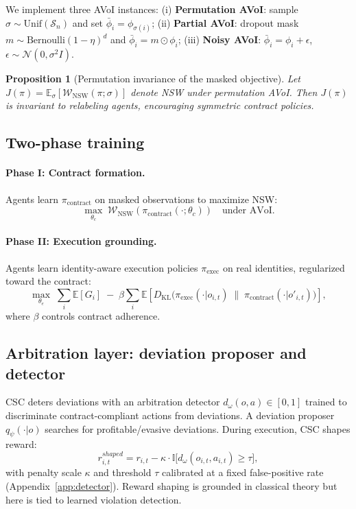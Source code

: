 \documentclass{article}
\theoremstyle{definition}
\theoremstyle{plain}
\newtheorem{proposition}{Proposition}
\theoremstyle{remark}
\newcommand{\NSW}{\mathcal{W}_{\mathrm{NSW}}}
\newcommand{\E}{\mathbb{E}}
\newcommand{\KL}{D_{\mathrm{KL}}}
\newcommand{\ind}{\mathbb{I}}
\begin{document}
We implement three AVoI instances:
(i) \textbf{Permutation AVoI}: sample $\sigma \sim \mathrm{Unif}(\mathcal{S}_n)$ and set $\bar{\phi}_i=\phi_{\sigma(i)}$;
(ii) \textbf{Partial AVoI}: dropout mask $m\sim\mathrm{Bernoulli}(1-\eta)^d$ and $\bar{\phi}_i=m\odot\phi_i$;
(iii) \textbf{Noisy AVoI}: $\bar{\phi}_i=\phi_i+\epsilon$, $\epsilon\sim\mathcal{N}(0,\sigma^2 I)$.

\begin{proposition}[Permutation invariance of the masked objective]
\label{prop:perm_invariance}
Let $J(\pi)=\E_{\sigma}[\NSW(\pi;\sigma)]$ denote NSW under permutation AVoI.
Then $J(\pi)$ is invariant to relabeling agents, encouraging symmetric contract policies.
\end{proposition}

\subsection{Two-phase training}
\label{sec:two_phase}

\paragraph{Phase I: Contract formation.}
Agents learn $\pi_{\text{contract}}$ on masked observations to maximize NSW:
\[
\max_{\theta_c}\; \NSW(\pi_{\text{contract}}(\cdot;\theta_c))\quad\text{under AVoI}.
\]

\paragraph{Phase II: Execution grounding.}
Agents learn identity-aware execution policies $\pi_{\text{exec}}$ on real identities, regularized toward the contract:
\begin{equation}
\label{eq:kl_ground}
\max_{\theta_e}\;\sum_i \E\!\left[G_i\right] \;-\; \beta \sum_i \E\!\left[\KL\big(\pi_{\text{exec}}(\cdot|o_{i,t})\;\|\;\pi_{\text{contract}}(\cdot|o'_{i,t})\big)\right],
\end{equation}
where $\beta$ controls contract adherence.

\subsection{Arbitration layer: deviation proposer and detector}
\label{sec:arbitration}

CSC deters deviations with an arbitration detector $d_\omega(o,a)\in[0,1]$ trained to discriminate contract-compliant actions from deviations.
A deviation proposer $q_\psi(\cdot|o)$ searches for profitable/evasive deviations.
During execution, CSC shapes reward:
\begin{equation}
\label{eq:shaping}
r^{shaped}_{i,t} = r_{i,t} - \kappa\cdot \ind\!\big[d_\omega(o_{i,t},a_{i,t}) \ge \tau\big],
\end{equation}
with penalty scale $\kappa$ and threshold $\tau$ calibrated at a fixed false-positive rate (Appendix~\ref{app:detector}).
Reward shaping is grounded in classical theory \citep{ng1999policyinvariance} but here is tied to learned violation detection.
\end{document}

